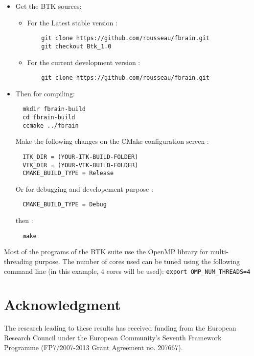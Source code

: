 \documentclass[a4paper,10pt]{article}
\begin{document}
  \begin{itemize}
  \item Get the BTK sources:
    \begin{itemize}
    \item For the Latest stable version :
    \begin{verbatim}
    git clone https://github.com/rousseau/fbrain.git
    git checkout Btk_1.0 
    \end{verbatim}
    \item For the current development version :
    \begin{verbatim}
    git clone https://github.com/rousseau/fbrain.git
    \end{verbatim}  
    \end{itemize}
  \item Then for compiling:
  \begin{verbatim}
  mkdir fbrain-build
  cd fbrain-build
  ccmake ../fbrain
  \end{verbatim}
  Make the following changes on the CMake configuration screen :
  \begin{verbatim}
  ITK_DIR = (YOUR-ITK-BUILD-FOLDER)
  VTK_DIR = (YOUR-VTK-BUILD-FOLDER)
  CMAKE_BUILD_TYPE = Release
  \end{verbatim}
  Or for debugging and developement purpose :
  \begin{verbatim}
  CMAKE_BUILD_TYPE = Debug
  \end{verbatim}
  then :
  \begin{verbatim}
  make
  \end{verbatim}

  \end{itemize}

  Most of the programs of the BTK suite use the OpenMP library for multi-threading
  purpose. The number of cores used can be tuned using the following command line
  (in this example, 4 cores will be used): \texttt{export OMP\_NUM\_THREADS=4}


  


  \section*{Acknowledgment}
  \small{The research leading to these results has received funding from the
  European Research Council under the European Community’s Seventh Framework
  Programme (FP7/2007-2013 Grant Agreement no. 207667).}


  
\end{document}
